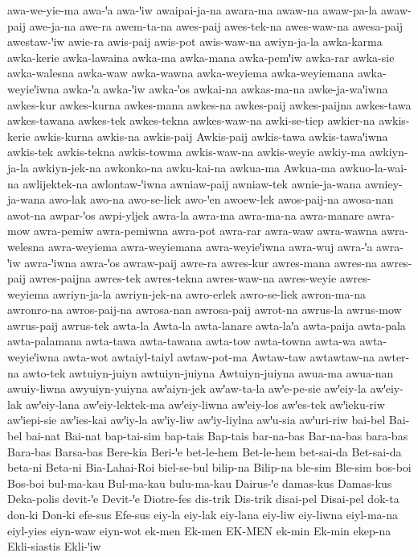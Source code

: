 {awa-we-yie-ma
awa-ꞌa
awa-ꞌiw
awaipai-ja-na
awara-ma
awaw-na
awaw-pa-la
awaw-paij
awe-ja-na
awe-ra
awem-ta-na
awes-paij
awes-tek-na
awes-waw-na
awesa-paij
awestaw-ꞌiw
awie-ra
awis-paij
awis-pot
awis-waw-na
awiyn-ja-la
awka-karma
awka-kerie
awka-lawaina
awka-ma
awka-mana
awka-pemꞌiw
awka-rar
awka-sie
awka-walesna
awka-waw
awka-wawna
awka-weyiema
awka-weyiemana
awka-weyieꞌiwna
awka-ꞌa
awka-ꞌiw
awka-ꞌos
awkai-na
awkas-ma-na
awke-ja-waꞌiwna
awkes-kur
awkes-kurna
awkes-mana
awkes-na
awkes-paij
awkes-paijna
awkes-tawa
awkes-tawana
awkes-tek
awkes-tekna
awkes-waw-na
awki-se-tiep
awkier-na
awkis-kerie
awkis-kurna
awkis-na
awkis-paij
Awkis-paij
awkis-tawa
awkis-tawaꞌiwna
awkis-tek
awkis-tekna
awkis-towma
awkis-waw-na
awkis-weyie
awkiy-ma
awkiyn-ja-la
awkiyn-jek-na
awkonko-na
awku-kai-na
awkua-ma
Awkua-ma
awkuo-la-wai-na
awlijektek-na
awlontaw-ꞌiwna
awniaw-paij
awniaw-tek
awnie-ja-wana
awniey-ja-wana
awo-lak
awo-na
awo-se-liek
awo-ꞌen
awoew-lek
awos-paij-na
awosa-nan
awot-na
awpar-ꞌos
awpi-yljek
awra-la
awra-ma
awra-ma-na
awra-manare
awra-mow
awra-pemiw
awra-pemiwna
awra-pot
awra-rar
awra-waw
awra-wawna
awra-welesna
awra-weyiema
awra-weyiemana
awra-weyieꞌiwna
awra-wuj
awra-ꞌa
awra-ꞌiw
awra-ꞌiwna
awra-ꞌos
awraw-paij
awre-ra
awres-kur
awres-mana
awres-na
awres-paij
awres-paijna
awres-tek
awres-tekna
awres-waw-na
awres-weyie
awres-weyiema
awriyn-ja-la
awriyn-jek-na
awro-erlek
awro-se-liek
awron-ma-na
awronro-na
awros-paij-na
awrosa-nan
awrosa-paij
awrot-na
awrus-la
awrus-mow
awrus-paij
awrus-tek
awta-la
Awta-la
awta-lanare
awta-laꞌa
awta-paija
awta-pala
awta-palamana
awta-tawa
awta-tawana
awta-tow
awta-towna
awta-wa
awta-weyieꞌiwna
awta-wot
awtaiyl-taiyl
awtaw-pot-ma
Awtaw-taw
awtawtaw-na
awter-na
awto-tek
awtuiyn-juiyn
awtuiyn-juiyna
Awtuiyn-juiyna
awua-ma
awua-nan
awuiy-liwna
awyuiyn-yuiyna
awꞌaiyn-jek
awꞌaw-ta-la
awꞌe-pe-sie
awꞌeiy-la
awꞌeiy-lak
awꞌeiy-lana
awꞌeiy-lektek-ma
awꞌeiy-liwna
awꞌeiy-los
awꞌes-tek
awꞌieku-riw
awꞌiepi-sie
awꞌies-kai
awꞌiy-la
awꞌiy-liw
awꞌiy-liylna
awꞌu-sia
awꞌuri-riw
bai-bel
Bai-bel
bai-nat
Bai-nat
bap-tai-sim
bap-tais
Bap-tais
bar-na-bas
Bar-na-bas
bara-bas
Bara-bas
Barsa-bas
Bere-kia
Beri-ꞌe
bet-le-hem
Bet-le-hem
bet-sai-da
Bet-sai-da
beta-ni
Beta-ni
Bia-Lahai-Roi
biel-se-bul
bilip-na
Bilip-na
ble-sim
Ble-sim
bos-boi
Bos-boi
bul-ma-kau
Bul-ma-kau
bulu-ma-kau
Dairus-ꞌe
damas-kus
Damas-kus
Deka-polis
devit-ꞌe
Devit-ꞌe
Diotre-fes
dis-trik
Dis-trik
disai-pel
Disai-pel
dok-ta
don-ki
Don-ki
efe-sus
Efe-sus
eiy-la
eiy-lak
eiy-lana
eiy-liw
eiy-liwna
eiyl-ma-na
eiyl-yies
eiyn-waw
eiyn-wot
ek-men
Ek-men
EK-MEN
ek-min
Ek-min
ekep-na
Ekli-siastis
Ekli-ꞌiw
}
